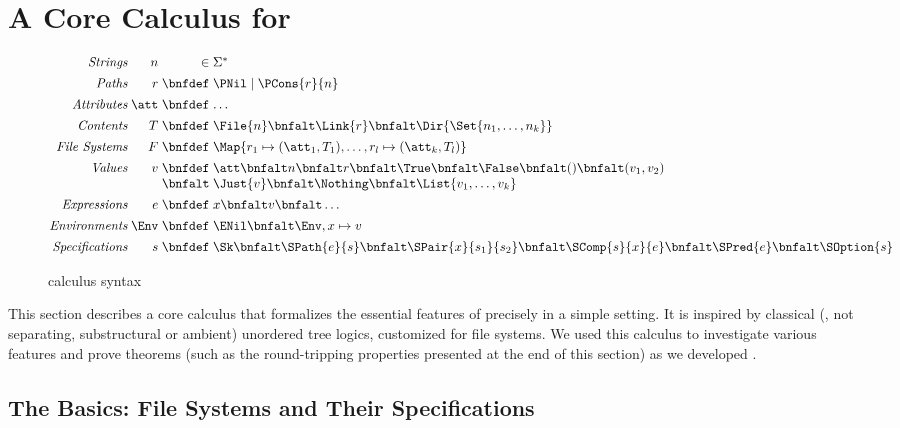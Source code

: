 \section{A Core Calculus for \forest{}}
\label{sec:theory}

\begin{figure}
\[
\begin{array}{@{}r@{\;}r@{\;}r@{\;}l@{\quad}l@{}}
\textit{Strings}        & n    & \in & \Sigma^{\ast} \\[1ex]
\textit{Paths}          & r    & \bnfdef & \PNil \mid \PCons{r}{n} \\[1ex]
\textit{Attributes}     & \att & \bnfdef & \dots\\[1ex]
\textit{Contents}       & T    & \bnfdef & \File{n} \bnfalt \Link{r} \bnfalt \Dir{ \Set{n_1,\dots,n_k} }\\[1ex]
\textit{File Systems}   & F    & \bnfdef & \Map{ r_1 \mapsto (\att_1,T_1), \dots, r_l \mapsto (\att_k,T_l) }\\[1ex]
\textit{Values}         & v    & \bnfdef & \att \bnfalt n \bnfalt r \bnfalt \True \bnfalt \False \bnfalt () \bnfalt (v_1,v_2) \\
                        &      & \bnfalt & \Just{v} \bnfalt \Nothing \bnfalt \List{v_1,\dots,v_k}\\[1ex]
\textit{Expressions}    & e    & \bnfdef & x \bnfalt v \bnfalt \dots \\[1ex]
\textit{Environments}   & \Env & \bnfdef & \ENil \bnfalt \Env,x\mapsto v \\[1ex]
\textit{Specifications} & s    & \bnfdef & 
        \Sk            
\bnfalt \SPath{e}{s}        
\bnfalt \SPair{x}{s_1}{s_2} 
\bnfalt \SComp{s}{x}{e}     
\bnfalt \SPred{e}           
\bnfalt \SOption{s}         
\end{array}
\]
\caption{\forest{} calculus syntax}
\label{fig:csyntax}
\end{figure}

This section describes a core calculus that formalizes the essential
features of \forest{} precisely in a simple setting. It is inspired by
classical (\ie{}, not separating, substructural or ambient) unordered
tree logics, customized for file systems. We used this calculus to
investigate various features and prove theorems (such as the
round-tripping properties presented at the end of this section) as we
developed \forest{}.

\subsection{The Basics: File Systems and Their Specifications}

